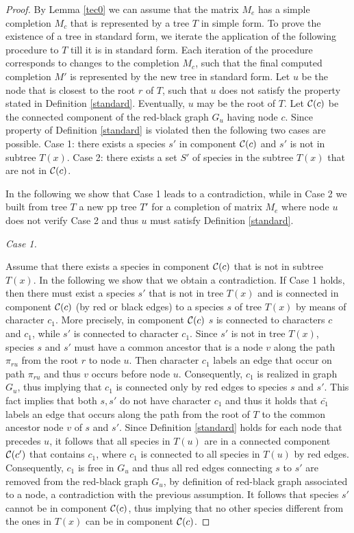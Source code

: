 \documentclass{llncs}
\begin{document}
\begin{proof}
By Lemma  \ref{tec0} we can assume that the matrix $M_e$ has a simple completion $M_c$ 
that is represented by a tree $T$ in simple form.
To prove the existence of a tree  in standard form, we iterate the application of the following procedure to $T$ till it is in standard form.  Each iteration of the procedure corresponds to changes to the completion $M_c$,
such that the  final computed completion $M'$  is represented by the new tree in standard form. 
Let $u$ be the node that is closest to the root $r$ of $T$, such that $u$ does not satisfy  the property stated in Definition \ref{standard}.  Eventually, $u$ may be the root of $T$.
 Let ${\cal C }(c)$ be the connected component of  the red-black graph  $G_u$ having node $c$.  Since property of   Definition \ref{standard} is violated then the following two cases are possible.
Case 1: there exists a species $s' $ in component ${\cal C }(c)$ and $s'$ is not in subtree $T(x)$.
Case 2:  there exists a set $S'$ of species in the subtree $T(x)$ that are not in ${\cal C }(c)$.


In the following we show that Case 1 leads to a contradiction, while in Case 2 we built  from tree $T$  a new pp tree $T'$ for a completion of matrix $M_e$  where node $u$ does not verify Case 2 and thus $u$ must satisfy Definition \ref{standard}.


 {\em Case 1.}
 
Assume that there exists a species in component ${\cal C }(c)$ that is  not in subtree $T(x)$.
In the following we show that we obtain a contradiction.  If Case 1 holds, then there must exist a species $s'$  that is not in tree $T(x)$  and  is connected in component ${\cal C }(c)$ (by  red or black edges) to a species $s$ of tree $T(x)$  by means of character $c_1$. More precisely, in component ${\cal C }(c)$ $s$ is connected to characters  $c$ and $c_1$, while $s'$ is connected to character $c_1$.  Since $s'$ is not in tree $T(x)$, species $s$ and $s'$ must have a common ancestor that is a node $v$ along the path $\pi_{ru}$ from the root $r$ to node $u$.    
Then  character $c_1$ labels an edge that occur on path $\pi_{ru}$ and thus $v$ occurs before node $u$.  Consequently,   $c_1$ is realized in graph $G_u$, thus implying that $c_1$ is connected  only by red edges to species $s$ and $s'$. This fact implies that both $s, s'$  do not have character $c_1$ and thus it holds that  $\bar{c_1}$ labels an edge that occurs along the path from the root of $T$ to the common ancestor node $v$ of $s$ and $s'$. 
 Since Definition \ref{standard} holds for each node that precedes $u$,  it follows that all species in $T(u)$ are in a connected component ${\cal C}(c')$ that contains $c_1$, where $c_1$ is connected to all species in $T(u)$ by red edges. Consequently,  $c_1$ is free in $G_u$ and thus all red edges connecting $s$ to $s'$ are removed from the red-black graph $G_u$, by definition of red-black graph associated to a node, a contradiction
with the previous assumption. It follows that  species $s'$ cannot be in component ${\cal C }(c)$, thus implying that no other species different from the ones in  $T(x)$ can be in component ${\cal C }(c)$.
 

\end{proof}
\end{document}
